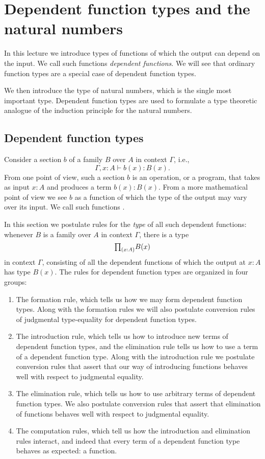 \section{Dependent function types and the natural numbers}

In this lecture we introduce types of functions of which the output can depend on the input. We call such functions \emph{dependent functions}. We will see that ordinary function types are a special case of dependent function types.

We then introduce the type of natural numbers, which is the single most important type. Dependent function types are used to formulate a type theoretic analogue of the induction principle for the natural numbers.

\subsection{Dependent function types}
Consider a section $b$ of a family $B$ over $A$ in context $\Gamma$, i.e.,
\begin{equation*}
  \Gamma,x:A\vdash b(x):B(x).
\end{equation*}
From one point of view, such a section $b$ is an operation, or a program, that takes as input $x:A$ and produces a term $b(x):B(x)$. From a more mathematical point of view we see $b$ as a function of which the type of the output may vary over its input. We call such functions .

In this section we postulate rules for the \emph{type} of all such dependent functions: whenever $B$ is a family over $A$ in context $\Gamma$, there is a type
\begin{equation*}
  \prd{x:A}B(x)
\end{equation*}
in context $\Gamma$, consisting of all the dependent functions of which the output at $x:A$ has type $B(x)$. The rules for dependent function types are organized in four groups:
\begin{enumerate}
\item The formation rule, which tells us how we may form dependent function types. Along with the formation rules we will also postulate conversion rules of judgmental type-equality for dependent function types.
\item The introduction rule, which tells us how to introduce new terms of dependent function types, and the elimination rule tells us how to use a term of a dependent function type. Along with the introduction rule we postulate conversion rules that assert that our way of introducing functions behaves well with respect to judgmental equality.
\item The elimination rule, which tells us how to use arbitrary terms of dependent function types. We also postulate conversion rules that assert that elimination of functions behaves well with respect to judgmental equality.
\item The computation rules, which tell us how the introduction and elimination rules interact, and indeed that every term of a dependent function type behaves as expected: a function.
\end{enumerate}

